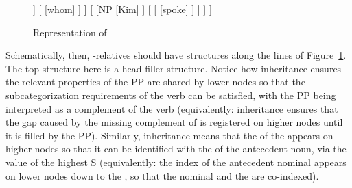 \documentclass[output=paper
 	        ,biblatex
                ,babelshorthands
                ,newtxmath
                ,draftmode
                ,colorlinks, citecolor=brown
]{langscibook}
\begin{document}
\begin{exe}\ex\begin{xlist}
  \ex\label{x:rc-19}
   \ex\label{x:rc-20}
 \end{xlist}
\end{exe}


\begin{figure}
\begin{forest}  %
[\avm{S [mod & \upshape \ibar{N}$_{\1}$ ]}
	[\avm{\3 PP [rel & \{ \1 \} ]}
		[P
			[to]
		]
		[
			[whom]
		]
	]
	[ 
		[NP
			[Kim]
		]
		[    
			[
				[spoke]
			]
		]
	]
]
\end{forest}
\caption{Representation of }
\label{fig:rc-1}
\end{figure}

Schematically, then, -relatives should have
structures along the lines of Figure~\ref{fig:rc-1}.
The top structure here is a head-filler
structure. Notice how  inheritance ensures the relevant properties of the
PP are shared by lower nodes so that the subcategorization requirements of the verb can
be satisfied, with the PP being interpreted as a complement of the verb (equivalently:
 inheritance ensures that the gap caused by the missing complement of
 is registered on higher nodes until it is filled by the PP). Similarly,
 inheritance means that the  of the  appears on
higher nodes so that it can be identified with the  of the antecedent noun,
via the  value of the highest S (equivalently: the index of the antecedent
nominal appears on lower nodes down to the , so that the nominal and the
 are co-indexed).
\end{document}
